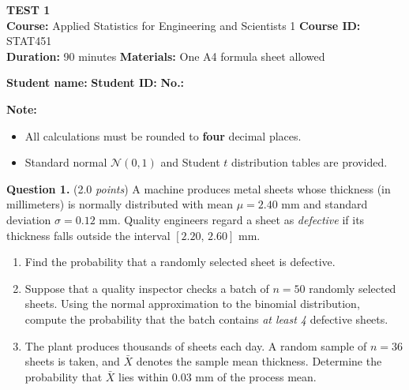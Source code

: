 \documentclass[12pt]{article}
\begin{document}
\begin{center}
\textbf{\large TEST 1}\\[2pt]
\textbf{Course:} Applied Statistics for Engineering and Scientists 1 \quad
\textbf{Course ID:} STAT451\\[2pt]
\textbf{Duration:} 90 minutes \hspace{1.5cm} \textbf{Materials:} One A4 formula sheet allowed
\end{center}

\vspace{-6pt}
\noindent\textbf{Student name:} \dotfill \quad \textbf{Student ID:} \dotfill \quad \textbf{No.:} \dotfill

\vspace{4pt}
\noindent\textbf{Note:}
\begin{itemize}[leftmargin=*,topsep=2pt,itemsep=0pt]
  \item All calculations must be rounded to \textbf{four} decimal places.
  \item Standard normal $\mathcal{N}(0,1)$ and Student $t$ distribution tables are provided.
\end{itemize}

\textbf{Question 1.} (2.0 \emph{points})
A machine produces metal sheets whose thickness (in millimeters) is
normally distributed with mean $\mu = 2.40$ mm and standard deviation
$\sigma = 0.12$ mm. Quality engineers regard a sheet as \emph{defective}
if its thickness falls outside the interval $[2.20,\, 2.60]$ mm.
\begin{enumerate}[label=(\alph*),leftmargin=*]
  \item Find the probability that a randomly selected sheet is defective.
  \item Suppose that a quality inspector checks a batch of $n = 50$
        randomly selected sheets. Using the normal approximation to the
        binomial distribution, compute the probability that the batch
        contains \emph{at least 4} defective sheets.
  \item The plant produces thousands of sheets each day. A random sample
        of $n = 36$ sheets is taken, and $\bar{X}$ denotes the sample
        mean thickness. Determine the probability that $\bar{X}$ lies
        within 0.03 mm of the process mean.
\end{enumerate}
\end{document}
